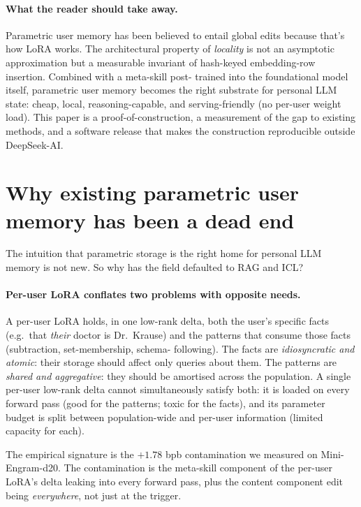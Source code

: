 \documentclass{article}
\begin{document}
\paragraph{What the reader should take away.}
Parametric user memory has been believed to entail global edits because
that's how LoRA works. The architectural property of \emph{locality}
is not an asymptotic approximation but a measurable invariant of
hash-keyed embedding-row insertion. Combined with a meta-skill post-
trained into the foundational model itself, parametric user memory
becomes the right substrate for personal LLM state: cheap, local,
reasoning-capable, and serving-friendly (no per-user weight load).
This paper is a proof-of-construction, a measurement of the gap to
existing methods, and a software release that makes the construction
reproducible outside DeepSeek-AI.


\section{Why existing parametric user memory has been a dead end}
\label{sec:dead-end}

The intuition that parametric storage is the right home for personal
LLM memory is not new. So why has the field defaulted to RAG and ICL?

\paragraph{Per-user LoRA conflates two problems with opposite needs.}
A per-user LoRA holds, in one low-rank delta, both the user's specific
facts (e.g.\ that \emph{their} doctor is Dr.\ Krause) and the patterns
that consume those facts (subtraction, set-membership, schema-
following). The facts are \emph{idiosyncratic and atomic}: their
storage should affect only queries about them. The patterns are
\emph{shared and aggregative}: they should be amortised across the
population. A single per-user low-rank delta cannot simultaneously
satisfy both: it is loaded on every forward pass (good for the
patterns; toxic for the facts), and its parameter budget is split
between population-wide and per-user information (limited capacity
for each).

The empirical signature is the $+1.78$ bpb contamination we measured
on Mini-Engram-d20. The contamination is the meta-skill component of
the per-user LoRA's delta leaking into every forward pass, plus the
content component edit being \emph{everywhere}, not just at the
trigger.
\end{document}

